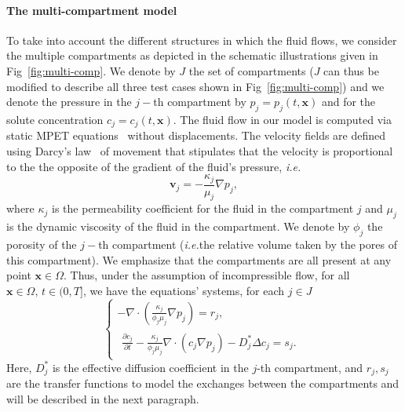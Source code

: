 \documentclass[10pt]{article}
\newcommand{\ie}{\emph{i.e.}\;}
\newcommand{\1}{^{(1)}}
\newcommand{\2}{^{(2)}}
\renewcommand{\div}{\nabla\cdot}
\newcommand{\Lap}{\Delta}
\newcommand {\x}   {\mathbf{x}}
\newcommand {\vel}   {\mathbf{v}}
\begin{document}
\paragraph{The multi-compartment model}
To take into account the different structures in which the fluid flows, we consider the multiple compartments as depicted in the schematic illustrations given in Fig~\ref{fig:multi-comp}. We denote by $J$ the set of compartments ($J$ can thus be modified to describe all three test cases shown in Fig~\ref{fig:multi-comp}) and we denote the pressure in the $j-$th compartment by $p_j = p_j(t,\x)$ and for the solute concentration $c_j = c_j(t,\x)$. 
The fluid flow in our model is computed via static MPET equations~\cite{Bai_1993_Multiporosity, tully_ventikos_2011} without displacements. 
The velocity fields are defined using Darcy's law~\cite{darcy1856fontaines} of movement that stipulates that the velocity is proportional to the the opposite of the gradient of the fluid's pressure, \ie  
\begin{equation}
\vel_j = -\frac{\kappa_j}{\mu_j} \nabla p_j,
\end{equation}
where $\kappa_j$ is the permeability coefficient for the fluid in the compartment $j$ and $\mu_j$ is the dynamic viscosity of the fluid in the compartment. 
We denote by $\phi_j$ the porosity of the $j-$th compartment (\ie the relative volume taken by the pores of this compartment).
We emphasize that the compartments are all present at any point $\x\in \Omega$. Thus, under the assumption of incompressible flow, for all $\x\in \Omega,\, t\in (0,T]$, we have the equations' systems, for each $j\in J$
\begin{equation}
    \begin{cases}
         -  \nabla\cdot( \frac{\kappa_j}{\phi_j \mu_j} \nabla p_j) = r_j,\\ %
          \begin{multlined} \frac{\partial c_j}{\partial t} - \frac{ \kappa_j}{\phi_j \mu_j}\div\left( c_j  \nabla p_j\right)  - D_j^* \Lap c_j 
         = s_j.%
         \end{multlined}
    \end{cases}
    \label{eq:main-system}
\end{equation}
Here, $D_j^*$ is the effective diffusion coefficient in the $j$-th compartment, and $r_{j}, s_{j}$ are the transfer functions to model the exchanges between the compartments and will be described in the next paragraph. 
\end{document}
